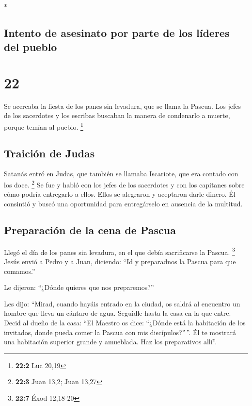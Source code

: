 \begin{paracol}{2}
\begin{otherlanguage}{english}
\switchcolumn[0]*

\hypertarget{intento-de-asesinato-por-parte-de-los-luxedderes-del-pueblo}{%
\subsection{Intento de asesinato por parte de los líderes del
pueblo}\label{intento-de-asesinato-por-parte-de-los-luxedderes-del-pueblo}}

\hypertarget{section-25}{%
\section{22}\label{section-25}}

 Se acercaba la fiesta de los panes sin levadura, que se
llama la Pascua.  Los jefes de los sacerdotes y los
escribas buscaban la manera de condenarlo a muerte, porque temían al
pueblo. \footnote{\textbf{22:2} Luc 20,19}

\hypertarget{traiciuxf3n-de-judas}{%
\subsection{Traición de Judas}\label{traiciuxf3n-de-judas}}

 Satanás entró en Judas, que también se llamaba Iscariote,
que era contado con los doce. \footnote{\textbf{22:3} Juan 13,2; Juan
  13,27}  Se fue y habló con los jefes de los sacerdotes y
con los capitanes sobre cómo podría entregarlo a ellos. 
Ellos se alegraron y aceptaron darle dinero.  Él consintió
y buscó una oportunidad para entregárselo en ausencia de la multitud.

\hypertarget{preparaciuxf3n-de-la-cena-de-pascua}{%
\subsection{Preparación de la cena de
Pascua}\label{preparaciuxf3n-de-la-cena-de-pascua}}

 Llegó el día de los panes sin levadura, en el que debía
sacrificarse la Pascua. \footnote{\textbf{22:7} Éxod 12,18-20}
 Jesús envió a Pedro y a Juan, diciendo: ``Id y
preparadnos la Pascua para que comamos.''

 Le dijeron: ``¿Dónde quieres que nos preparemos?''

 Les dijo: ``Mirad, cuando hayáis entrado en la ciudad,
os saldrá al encuentro un hombre que lleva un cántaro de agua. Seguidle
hasta la casa en la que entre.  Decid al dueño de la
casa: ``El Maestro os dice: ``¿Dónde está la habitación de los
invitados, donde pueda comer la Pascua con mis discípulos?''\,''.
 Él te mostrará una habitación superior grande y
amueblada. Haz los preparativos allí''.


\end{otherlanguage}
\end{paracol}
